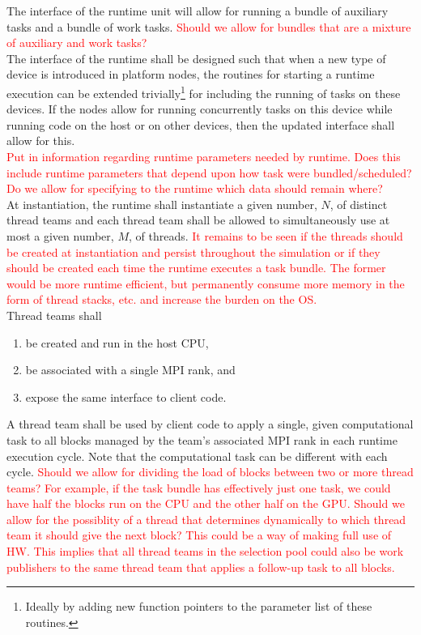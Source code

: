 \documentclass{article}
\begin{document}
The interface of the runtime unit will allow for running a bundle of auxiliary
tasks and a bundle of work tasks.  \textcolor{red}{Should we allow for bundles
that are a mixture of auxiliary and work tasks?}\\

The interface of the runtime shall be designed such  that when a new type of
device is introduced in platform nodes, the routines for starting a runtime
execution can be extended trivially\footnote{Ideally by adding new function
pointers to the parameter list of these routines.} for including the running of
tasks on these devices.  If the nodes allow for running concurrently tasks on
this device while running code on the host or on other devices, then the updated
interface shall allow for this.\\

\textcolor{red}{Put in information regarding runtime parameters needed by
runtime.  Does this include runtime parameters that depend upon how task were
bundled/scheduled?}\\

\textcolor{red}{Do we allow for specifying to the runtime which data should
remain where?}\\

At instantiation, the runtime shall instantiate a given number, $N$, of distinct
thread teams and each thread team shall be allowed to simultaneously use
at most a given number, $M$, of threads.  \textcolor{red}{It remains to be seen
if the threads should be created at instantiation and persist throughout the
simulation or if they should be created each time the runtime executes a task
bundle.  The former would be more runtime efficient, but permanently consume
more memory in the form of thread stacks, etc. and increase the burden on the
OS.}\\

Thread teams shall
\begin{enumerate}
\item{be created and run in the host CPU,}
\item{be associated with a single MPI rank, and}
\item{expose the same interface to client code.}
\end{enumerate}

A thread team shall be used by client code to apply a single, given
computational task to all blocks managed by the team's associated MPI rank in
each runtime execution cycle.  Note that the computational task can be different
with each cycle.  \textcolor{red}{Should we allow for dividing the load of blocks
between two or more thread teams?  For example, if the task bundle
has effectively just one task, we could have half the blocks run on the CPU and
the other half on the GPU.  Should we allow for the possiblity of a thread that
determines dynamically to which thread team it should give the next block?  This
could be a way of making full use of HW.  This implies that all thread teams in
the selection pool could also be work publishers to the same thread team that
applies a follow-up task to all blocks.}\\
\end{document}
